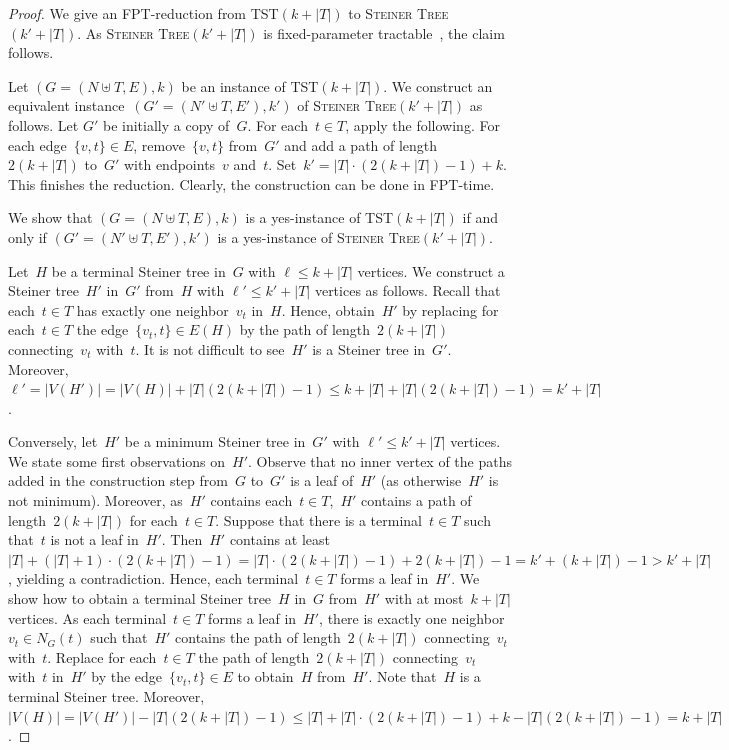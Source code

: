 \documentclass[11pt,a4,USenglish]{article}
\newcommand{\prob}[1]{\textsc{#1}}
\newcommand{\pprob}[2]{\prob{#1}$(#2)$}
\theoremstyle{definition}
\theoremstyle{plain}
\theoremstyle{remark}
\begin{document}
\begin{proof}
We give an FPT-reduction from \pprob{TST}{k+|T|} to \pprob{Steiner Tree}{k'+|T|}. As \pprob{Steiner Tree}{k'+|T|} is fixed-parameter tractable~\cite{DreyfusW71}, the claim follows.

Let $(G=(N\uplus T,E),k)$ be an instance of \pprob{TST}{k+|T|}.
We construct an equivalent instance~$(G'=(N'\uplus T,E'),k')$ of \pprob{Steiner Tree}{k'+|T|} as follows.
Let $G'$ be initially a copy of~$G$.
For each~$t\in T$, apply the following.
For each edge~$\{v,t\}\in E$, remove~$\{v,t\}$ from~$G'$ and add a path of length~$2(k+|T|)$ to~$G'$ with endpoints~$v$ and~$t$.
Set~$k'=|T|\cdot(2(k+|T|)-1)+k$.
This finishes the reduction.
Clearly, the construction can be done in FPT-time.

We show that $(G=(N\uplus T,E),k)$ is a yes-instance of \pprob{TST}{k+|T|} if and only if $(G'=(N'\uplus T,E'),k')$ is a yes-instance of \pprob{Steiner Tree}{k'+|T|}.

Let~$H$ be a terminal Steiner tree in~$G$ with $\ell\leq k+|T|$ vertices.
We construct a Steiner tree~$H'$ in~$G'$ from~$H$ with $\ell'\leq k'+|T|$ vertices as follows.
Recall that each~$t\in T$ has exactly one neighbor~$v_t$ in~$H$.
Hence, obtain~$H'$ by replacing for each~$t\in T$ the edge~$\{v_t,t\}\in E(H)$ by the path of length~$2(k+|T|)$ connecting~$v_t$ with~$t$.
It is not difficult to see~$H'$ is a Steiner tree in~$G'$.
Moreover, $\ell'=|V(H')|=|V(H)|+|T|(2(k+|T|)-1)\leq k+|T|+|T|(2(k+|T|)-1)=k'+|T|$.

Conversely, let~$H'$ be a minimum Steiner tree in~$G'$ with $\ell'\leq k'+|T|$ vertices.
We state some first observations on~$H'$.
Observe that no inner vertex of the paths added in the construction step from~$G$ to~$G'$ is a leaf of~$H'$ (as otherwise~$H'$ is not minimum).
Moreover, as~$H'$ contains each~$t\in T$,~$H'$ contains a path of length~$2(k+|T|)$ for each~$t\in T$.
Suppose that there is a terminal~$t\in T$ such that~$t$ is not a leaf in~$H'$.
Then~$H'$ contains at least~$|T|+(|T|+1)\cdot(2(k+|T|)-1)=|T|\cdot(2(k+|T|)-1)+2(k+|T|)-1=k'+(k+|T|)-1>k'+|T|$, yielding a contradiction.
Hence, each terminal~$t\in T$ forms a leaf in~$H'$.
We show how to obtain a terminal Steiner tree~$H$ in~$G$ from~$H'$ with at most~$k+|T|$ vertices.
As each terminal~$t\in T$ forms a leaf in~$H'$, there is exactly one neighbor~$v_t\in N_G(t)$ such that~$H'$ contains the path of length~$2(k+|T|)$ connecting~$v_t$ with~$t$.
Replace for each~$t\in T$ the path of length~$2(k+|T|)$ connecting~$v_t$ with~$t$ in~$H'$ by the edge~$\{v_t,t\}\in E$ to obtain~$H$ from~$H'$.
Note that~$H$ is a terminal Steiner tree.
Moreover, $|V(H)|=|V(H')|-|T|(2(k+|T|)-1)\leq |T|+|T|\cdot(2(k+|T|)-1)+k-|T|(2(k+|T|)-1)=k+|T|$.
%
\end{proof}
\end{document}
